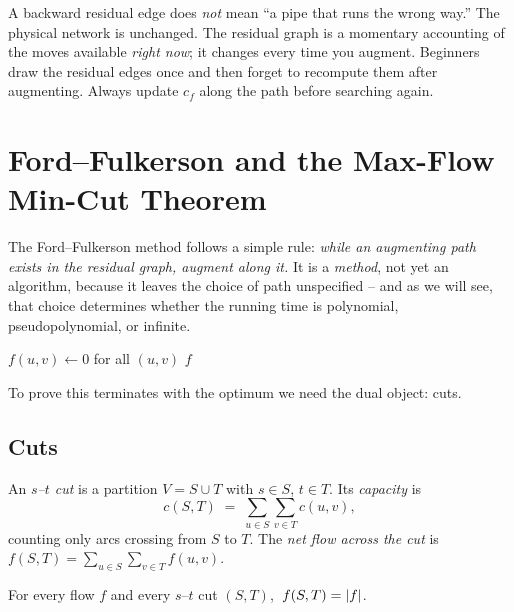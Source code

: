 \begin{trapbox}
A backward residual edge does \emph{not} mean ``a pipe that runs the wrong way.''
The physical network is unchanged. The residual graph is a momentary accounting of
the moves available \emph{right now}; it changes every time you augment.
Beginners draw the residual edges once and then forget to recompute them after
augmenting. Always update $c_f$ along the path before searching again.
\end{trapbox}

\section{Ford--Fulkerson and the Max-Flow Min-Cut Theorem}
\label{ch12:ff}

The Ford--Fulkerson method follows a simple rule: \emph{while an
augmenting path exists in the residual graph, augment along it.} It is a \emph{method}, not yet an
algorithm, because it leaves the choice of path unspecified -- and as we will see, that choice determines
whether the running time is polynomial, pseudopolynomial, or infinite.

\begin{algorithm}[H]
\caption{\textsc{Ford--Fulkerson} (generic augmenting-path method)}
\label{ch12:alg-ff}
$f(u,v)\gets 0$ for all $(u,v)$\;
\Return $f$\;
\end{algorithm}

To prove this terminates with the optimum we need the dual object: cuts.

\subsection{Cuts}

\begin{definition}[$s$--$t$ cut]
\label{ch12:def-cut}
An \emph{$s$--$t$ cut} is a partition $V=S\cup T$ with $s\in S$, $t\in T$. Its
\emph{capacity} is
\[
  c(S,T)\;=\;\sum_{u\in S}\sum_{v\in T} c(u,v),
\]
counting only arcs crossing from $S$ to $T$. The \emph{net flow across the cut} is
$f(S,T)=\sum_{u\in S}\sum_{v\in T} f(u,v)$.
\end{definition}

\begin{lemma}
\label{ch12:lem-flow-cut}
For every flow $f$ and every $s$--$t$ cut $(S,T)$, $\;f(S,T)=\lvert f\rvert$.
\end{lemma}

